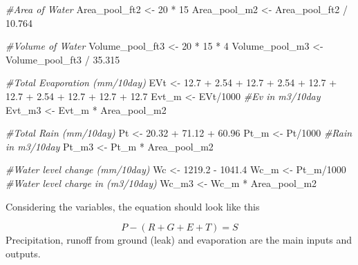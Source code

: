 \documentclass[
]{article}
\newenvironment{Shaded}{\begin{snugshade}}{\end{snugshade}}
\newcommand{\CommentTok}[1]{\textcolor[rgb]{0.56,0.35,0.01}{\textit{#1}}}
\newcommand{\DecValTok}[1]{\textcolor[rgb]{0.00,0.00,0.81}{#1}}
\newcommand{\FloatTok}[1]{\textcolor[rgb]{0.00,0.00,0.81}{#1}}
\newcommand{\NormalTok}[1]{#1}
\newcommand{\OtherTok}[1]{\textcolor[rgb]{0.56,0.35,0.01}{#1}}
\newcommand{\SpecialCharTok}[1]{\textcolor[rgb]{0.00,0.00,0.00}{#1}}
\begin{document}
\begin{Shaded}
\begin{Highlighting}[]
\CommentTok{\#Area of Water}
\NormalTok{Area\_pool\_ft2 }\OtherTok{\textless{}{-}} \DecValTok{20} \SpecialCharTok{*} \DecValTok{15} 
\NormalTok{Area\_pool\_m2 }\OtherTok{\textless{}{-}}\NormalTok{ Area\_pool\_ft2 }\SpecialCharTok{/} \FloatTok{10.764}

\CommentTok{\#Volume of Water}
\NormalTok{Volume\_pool\_ft3 }\OtherTok{\textless{}{-}} \DecValTok{20} \SpecialCharTok{*} \DecValTok{15} \SpecialCharTok{*} \DecValTok{4}
\NormalTok{Volume\_pool\_m3 }\OtherTok{\textless{}{-}}\NormalTok{ Volume\_pool\_ft3 }\SpecialCharTok{/} \FloatTok{35.315}


\CommentTok{\#Total Evaporation (mm/10day)}
\NormalTok{EVt }\OtherTok{\textless{}{-}}  \FloatTok{12.7} \SpecialCharTok{+} \FloatTok{2.54} \SpecialCharTok{+} \FloatTok{12.7} \SpecialCharTok{+} \FloatTok{2.54} \SpecialCharTok{+} \FloatTok{12.7} \SpecialCharTok{+} \FloatTok{12.7} \SpecialCharTok{+} \FloatTok{2.54} \SpecialCharTok{+} \FloatTok{12.7} \SpecialCharTok{+} \FloatTok{12.7} \SpecialCharTok{+} \FloatTok{12.7}
\NormalTok{Evt\_m }\OtherTok{\textless{}{-}}\NormalTok{ EVt}\SpecialCharTok{/}\DecValTok{1000}
\CommentTok{\#Ev in m3/10day}
\NormalTok{Evt\_m3 }\OtherTok{\textless{}{-}}\NormalTok{ Evt\_m }\SpecialCharTok{*}\NormalTok{ Area\_pool\_m2}

\CommentTok{\#Total Rain (mm/10day)}
\NormalTok{Pt }\OtherTok{\textless{}{-}} \FloatTok{20.32} \SpecialCharTok{+} \FloatTok{71.12} \SpecialCharTok{+} \FloatTok{60.96}
\NormalTok{Pt\_m }\OtherTok{\textless{}{-}}\NormalTok{ Pt}\SpecialCharTok{/}\DecValTok{1000}
\CommentTok{\#Rain in m3/10day}
\NormalTok{Pt\_m3 }\OtherTok{\textless{}{-}}\NormalTok{ Pt\_m }\SpecialCharTok{*}\NormalTok{ Area\_pool\_m2}

\CommentTok{\#Water level change (mm/10day)}
\NormalTok{Wc }\OtherTok{\textless{}{-}} \FloatTok{1219.2} \SpecialCharTok{{-}} \FloatTok{1041.4}
\NormalTok{Wc\_m }\OtherTok{\textless{}{-}}\NormalTok{ Pt\_m}\SpecialCharTok{/}\DecValTok{1000} 
\CommentTok{\#Water level charge in (m3/10day)}
\NormalTok{Wc\_m3 }\OtherTok{\textless{}{-}}\NormalTok{ Wc\_m }\SpecialCharTok{*}\NormalTok{ Area\_pool\_m2}
\end{Highlighting}
\end{Shaded}

Considering the variables, the equation should look like this

\[ P-(R+G+E+T)=  S \] Precipitation, runoff from ground (leak) and
evaporation are the main inputs and outputs.
\end{document}
